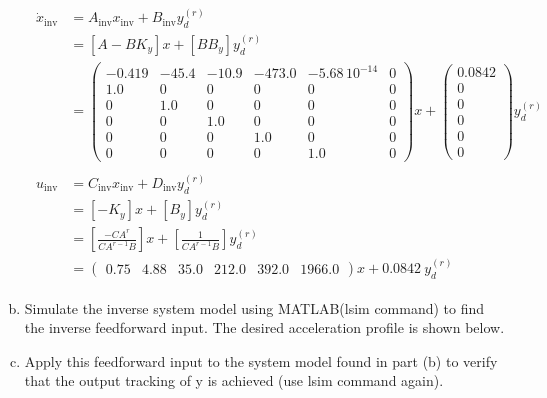 \documentclass[12pt]{article}
\begin{document}
\begin{enumerate}[(a)]
    \begin{align*}
      \begin{split}
      \dot{x}_\text{inv} &= A_\text{inv} x_\text{inv} + B_\text{inv} y^{(r)}_d \\
             &= [A - BK_y] x + [BB_y] y^{(r)}_d \\
             &= \left(\begin{array}{cccccc} -0.419 & -45.4 & -10.9 & -473.0 & -5.68\,{10}^{-14} & 0\\ 1.0 & 0 & 0 & 0 & 0 & 0\\ 0 & 1.0 & 0 & 0 & 0 & 0\\ 0 & 0 & 1.0 & 0 & 0 & 0\\ 0 & 0 & 0 & 1.0 & 0 & 0\\ 0 & 0 & 0 & 0 & 1.0 & 0 \end{array}\right) x + \left(\begin{array}{c} 0.0842\\ 0\\ 0\\ 0\\ 0\\ 0 \end{array}\right) y^{(r)}_d
      \end{split}
      \\[2ex]
      \begin{split}
      u_\text{inv} &= C_\text{inv} x_\text{inv} + D_\text{inv} y^{(r)}_d \\
             &= [-K_y] x + [B_y] y^{(r)}_d \\
             &= [\frac{-CA^r}{CA^{r-1}B}] x + [\frac{1}{CA^{r-1}B}] y^{(r)}_d \\
             &= \left(\begin{array}{cccccc} 0.75 & 4.88 & 35.0 & 212.0 & 392.0 & 1966.0 \end{array}\right) x + 0.0842\ y^{(r)}_d
      \end{split}
    \end{align*}

    \clearpage

    \item Simulate the inverse system model using MATLAB(lsim command) to find the inverse feedforward input. The desired acceleration profile is shown below.
    \item Apply this feedforward input to the system model found in part (b) to verify that the output tracking of y is achieved (use lsim command again).


\end{enumerate}
\end{document}
